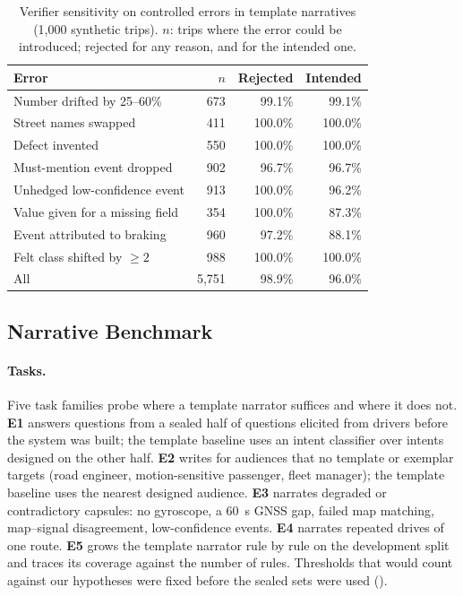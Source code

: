 \begin{table}[t]
\caption{Verifier sensitivity on controlled errors in template narratives (1{,}000 synthetic trips). $n$: trips where the error could be introduced; rejected for any reason, and for the intended one.}
\label{tab:verifier}
\small
\setlength{\tabcolsep}{4pt}
\begin{tabular}{@{}lrrr@{}}
\toprule
Error & $n$ & Rejected & Intended\\
\midrule
Number drifted by 25--60\% & 673 & 99.1\% & 99.1\%\\
Street names swapped & 411 & 100.0\% & 100.0\%\\
Defect invented & 550 & 100.0\% & 100.0\%\\
Must-mention event dropped & 902 & 96.7\% & 96.7\%\\
Unhedged low-confidence event & 913 & 100.0\% & 96.2\%\\
Value given for a missing field & 354 & 100.0\% & 87.3\%\\
Event attributed to braking & 960 & 97.2\% & 88.1\%\\
Felt class shifted by $\ge2$ & 988 & 100.0\% & 100.0\%\\
\midrule
All & 5{,}751 & 98.9\% & 96.0\%\\
\bottomrule
\end{tabular}
\end{table}

\subsection{Narrative Benchmark}
\label{sec:bench}

\paragraph{Tasks.}
Five task families probe where a template narrator suffices and where it does not.
\textbf{E1} answers questions from a sealed half of \TBD{} questions elicited from drivers before the system was built; the template baseline uses an intent classifier over intents designed on the other half.
\textbf{E2} writes for audiences that no template or exemplar targets (road engineer, motion-sensitive passenger, fleet manager); the template baseline uses the nearest designed audience.
\textbf{E3} narrates degraded or contradictory capsules: no gyroscope, a 60~s GNSS gap, failed map matching, map--signal disagreement, low-confidence events.
\textbf{E4} narrates repeated drives of one route.
\textbf{E5} grows the template narrator rule by rule on the development split and traces its coverage against the number of rules.
Thresholds that would count against our hypotheses were fixed before the sealed sets were used ().

